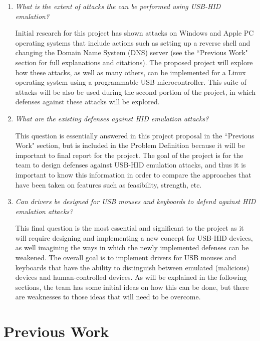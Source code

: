 \documentclass[pagenumbers]{ieee}
\begin{document}
\begin{enumerate}
\item \textit{What is the extent of attacks the can be performed using USB-HID emulation?}

Initial research for this project has shown attacks on Windows and Apple PC operating systems that include actions such as setting up a reverse shell and changing the Domain Name System (DNS) server (see the ``Previous Work" section for full explanations and citations). The proposed project will explore how these attacks, as well as many others, can be implemented for a  Linux operating system using a programmable USB microcontroller. This suite of attacks will be also be used during the second portion of the project, in which defenses against these attacks will be explored.

\item \textit{What are the existing defenses against HID emulation attacks?}

This question is essentially answered in this project proposal in the ``Previous Work" section, but is included in the Problem Definition because it will be important to final report for the project. The goal of the project is for the team to design defenses against USB-HID emulation attacks, and thus it is important to know this information  in order to compare the approaches that have been taken on features such as feasibility, strength, etc.

\item \textit{Can drivers be designed for USB mouses and keyboards to defend against HID emulation attacks?}

This final question is the most essential and significant to the project as it will require designing and implementing a new concept for USB-HID devices, as well imagining the ways in which the newly implemented defenses can be weakened. The overall goal is to implement drivers for USB mouses and keyboards that have the ability to distinguish between emulated (malicious) devices and human-controlled devices. As will be explained in the following sections, the team has some initial ideas on how this can be done, but there are weaknesses to those ideas that will need to be overcome.

\end{enumerate}


\section{Previous Work}
\end{document}
